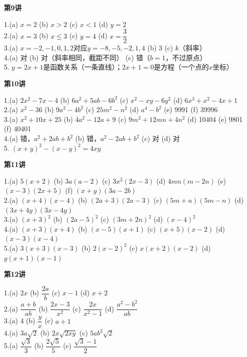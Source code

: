 \textbf{第9讲}

1.(a) $x=2$ \quad (b) $x>2$ \quad (c) $x<1$ \quad (d) $y=2$\\
2.(a) $x=3$ \quad (b) $x\le3$ \quad (c) $y=4$ \quad (d) $x=\dfrac32$\\
3.(a) $x=-2,-1,0,1,2$对应$y=-8,-5,-2,1,4$ \quad (b) 3 \quad (c) $k$（斜率）\\
4.(a) 对 \quad (b) 对（斜率相同，截距不同） \quad (c) 错（$b=1$，不过原点）\\
5. $y=2x+1$是函数关系（一条直线）；$2x+1=0$是方程（一个点的$x$坐标）


\textbf{第10讲}

1.(a) $2x^2-7x-4$ \quad (b) $6a^2+5ab-6b^2$ \quad (c) $x^2-xy-6y^2$ \quad (d) $6x^3+x^2-4x+1$\\
2.(a) $x^2-36$ \quad (b) $9a^2-4b^2$ \quad (c) $25m^2-n^2$ \quad (d) $a^4-b^2$ \quad (e) 9991 \quad (f) 39996\\
3.(a) $x^2+10x+25$ \quad (b) $4a^2-12a+9$ \quad (c) $9m^2+12mn+4n^2$ \quad (d) 10404 \quad (e) 9801 \quad (f) 40401\\
4.(a) 错，$a^2+2ab+b^2$ \quad (b) 错，$a^2-2ab+b^2$ \quad (c) 对 \quad (d) 对\\
5. $(x+y)^2-(x-y)^2=4xy$

\textbf{第11讲}

1.(a) $5(x+2)$ \quad (b) $3a(a-2)$ \quad (c) $3x^2(2x-3)$ \quad (d) $4mn(m-2n)$ \quad (e) $(x-3)(2x+5)$ \quad (f) $(x+y)(3a-2b)$\\
2.(a) $(x+4)(x-4)$ \quad (b) $(2a+3)(2a-3)$ \quad (c) $(5m+n)(5m-n)$ \quad (d) $(3x+4y)(3x-4y)$\\
3.(a) $(x+3)^2$ \quad (b) $(2a-5)^2$ \quad (c) $(3m+2n)^2$ \quad (d) $(x-4)^2$\\
4.(a) $(x+3)(x+4)$ \quad (b) $(x-5)(x+1)$ \quad (c) $(x+5)(x-2)$ \quad (d) $(x-3)(x-4)$\\
5.(a) $3(x+3)(x-3)$ \quad (b) $2(x-2)^2$ \quad (c) $x(x+2)(x-2)$ \quad (d) $y(x+1)(x-1)$

\textbf{第12讲}

1.(a) $2x$ \quad (b) $\dfrac{2a}{b}$ \quad (c) $x-1$ \quad (d) $x+2$\\
2.(a) $\dfrac{a+b}{ab}$ \quad (b) $\dfrac{2x-3}{x^2}$ \quad (c) $\dfrac{2x}{x^2-1}$ \quad (d) $\dfrac{a^2-b^2}{ab}$\\
3.(a) 4 \quad (b) $\dfrac{y}{x}$ \quad (c) $a+1$\\
4.(a) $3a\sqrt2$ \quad (b) $2x\sqrt{2xy}$ \quad (c) $5ab^2\sqrt2$\\
5.(a) $\dfrac{\sqrt3}{3}$ \quad (b) $\dfrac{2\sqrt5}{5}$ \quad (c) $\dfrac{\sqrt3-1}{2}$

